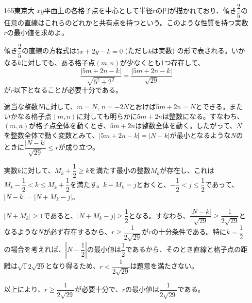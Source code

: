 \begin{prob}{165}{\maru}{東京大}
 $xy$平面上の各格子点を中心として半径$r$の円が描かれており、傾き$\dfrac{2}{5}$の任意の直線はこれらのどれかと共有点を持つという。このような性質を持つ実数$r$の最小値を求めよ。
\end{prob}

傾き$\dfrac{2}{5}$の直線の方程式は$5x+2y-k=0$ (ただし$k$は実数) の形で表される。いかなる$k$に対しても、ある格子点$(m, n)$が少なくとも1つ存在して、
\[ \frac{|5m+2n-k|}{\sqrt{5^2+2^2}}=\frac{|5m+2n-k|}{\sqrt{29}} \]
が$r$以下となることが必要十分である。

適当な整数$N$に対して、$m=N$, $n=-2N$とおけば$5m+2n=N$とできる。またいかなる格子点$(m, n)$に対しても明らかに$5m+2n$は整数になる。すなわち、$(m, n)$が格子点全体を動くとき、$5m+2n$は整数全体を動く。したがって、$N$を整数全体で動く変数とみて、$|5m+2n-k|=|N-k|$が最小となるような$N$のときに$\dfrac{|N-k|}{\sqrt{29}}\le r$が成り立つ。

実数$k$に対して、$M_k+\dfrac{1}{2}\ge k$を満たす最小の整数$M_k$が存在し、これは$M_k-\dfrac{1}{2}<k\le M_k+\dfrac{1}{2}$を満たす。$k-M_k=j$とおくと、$-\dfrac{1}{2}<j\le\dfrac{1}{2}$であって、$|N-k|=|N+M_k-j|$。

$|N+M_k|\ge 1$であると、$|N+M_k-j|\ge\dfrac{1}{2}$となる。すなわち、$\dfrac{|N-k|}{\sqrt{29}}\ge\dfrac{1}{2\sqrt{29}}$となるような$N$が必ず存在するから、$r\ge\dfrac{1}{2\sqrt{29}}$が$r$の十分条件である。特に$k=\dfrac{1}{2}$の場合を考えれば、$\left|N-\dfrac{1}{2}\right|$の最小値は$\dfrac{1}{2}$であるから、そのとき直線と格子点の距離は$\sqrt{1}{2\sqrt{29}}$となり得るため、$r<\dfrac{1}{2\sqrt{29}}$は題意を満たさない。

以上により、$r\ge\dfrac{1}{2\sqrt{29}}$が必要十分で、$r$の最小値は$\dfrac{1}{2\sqrt{29}}$である。
